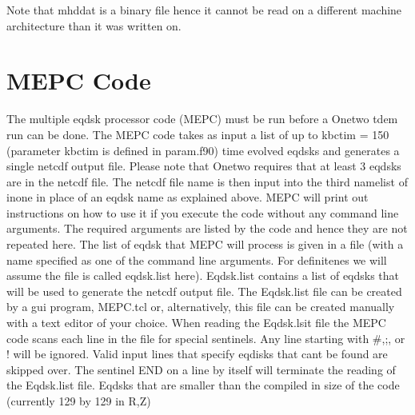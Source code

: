 \documentclass[12pt]{article}
\begin{document}
     Note that mhddat is a binary file hence it cannot be read  on
     a different machine architecture than it was written on.
     \section{MEPC Code}
       The multiple eqdsk processor code (MEPC)  must be run 
       before a Onetwo tdem run can be done. The MEPC code
       takes as input a list of up to kbctim = 150 (parameter kbctim is
       defined in param.f90) time evolved eqdsks and generates a single
       netcdf output file. Please note that Onetwo requires that at
       least 3 eqdsks are
       in the netcdf file.  The  netcdf file name  is then input into the
       third namelist of inone in place of an eqdsk name as explained
       above. MEPC will print out instructions on how to use it if you
       execute the code without any command line arguments. The
       required arguments are listed by the code and hence they are
       not repeated here. The list of eqdsk that MEPC will process is
       given in a file (with a name specified as one of the command
       line arguments. For definitenes we will assume the file is
       called eqdsk.list here). Eqdsk.list contains a list of eqdsks that
       will be used to generate the netcdf output file. The Eqdsk.list
       file can be created  by a gui program,
       MEPC.tcl  or, alternatively, this file can be created manually
       with a text editor of your choice.
       When reading the Eqdsk.lsit file the MEPC code scans each line
       in the file for special sentinels. Any line starting with
       \#,;, or ! will be ignored. Valid input lines that specify
       eqdisks that cant be found are skipped over. The sentinel 
       END on a line by itself will terminate the reading of the
       Eqdsk.list file. Eqdsks that are smaller than the compiled
       in size of the code (currently 129 by 129 in R,Z)
\end{document}
